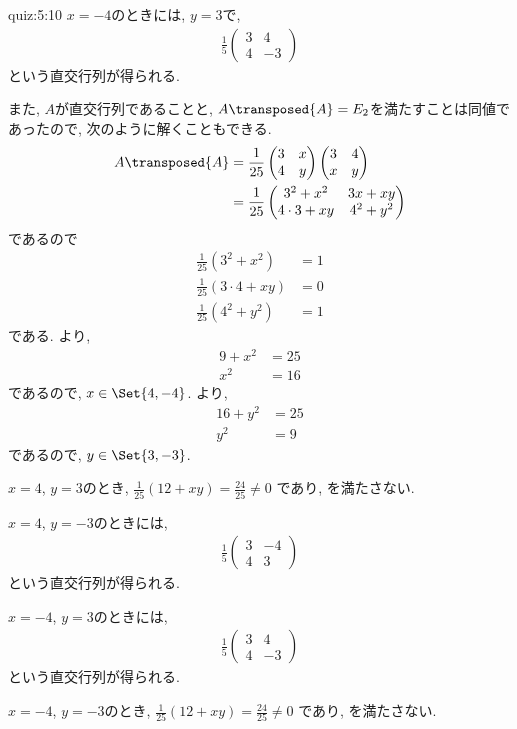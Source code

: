 \begin{answerof}{quiz:5:10}
  $x=-4$のときには,
  $y=3$で,
  \begin{align*}
    \frac{1}{5}\begin{pmatrix}3&4\\4&-3\end{pmatrix}
  \end{align*}
  という直交行列が得られる.


  また, $A$が直交行列であることと, $A\transposed{A}=E_2$を満たすことは同値であったので, 次のように解くこともできる.
  \begin{align*}
    A\transposed{A}
    &=\frac{1}{25}\begin{pmatrix}3&x\\4&y\end{pmatrix}\begin{pmatrix}3&4\\x&y\end{pmatrix}\\
    &=\frac{1}{25}\begin{pmatrix}3^2+x^2&3x+xy\\4\cdot 3+xy&4^2+y^2\end{pmatrix}
  \end{align*}
  であるので
  \begin{align}
    \frac{1}{25}(3^2+x^2)&=1\label{orthomat:eq4}\\
    \frac{1}{25}(3\cdot 4+xy)&=0\label{orthomat:eq5}\\
    \frac{1}{25}(4^2+y^2)&=1\label{orthomat:eq6}
  \end{align}
  である.
  より, 
  \begin{align*}
    9+x^2&=25\\
    x^2&=16
  \end{align*}
  であるので, $x\in\Set{4,-4}$.
    より, 
  \begin{align*}
    16+y^2&=25\\
    y^2&=9
  \end{align*}
  であるので, $y\in\Set{3,-3}$.

  $x=4$, $y=3$のとき,
  $\frac{1}{25}(12+xy)=\frac{24}{25}\neq 0$
  であり,
   を満たさない.

  $x=4$,
  $y=-3$のときには,
  \begin{align*}
    \frac{1}{5}\begin{pmatrix}3&-4\\4&3\end{pmatrix}
  \end{align*}
  という直交行列が得られる.

  $x=-4$,
  $y=3$のときには,
  \begin{align*}
    \frac{1}{5}\begin{pmatrix}3&4\\4&-3\end{pmatrix}
  \end{align*}
  という直交行列が得られる.
  
  $x=-4$, $y=-3$のとき,
  $\frac{1}{25}(12+xy)=\frac{24}{25}\neq 0$
  であり,
   を満たさない.
\end{answerof}

